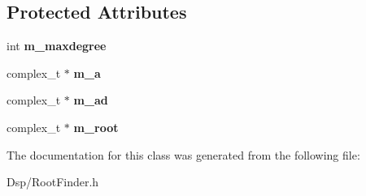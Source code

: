 \subsection*{Protected Attributes}
\begin{DoxyCompactItemize}
\item 
\hypertarget{classDsp_1_1RootFinderBase_a9fcde7ebb2e7bf68fb073331eda78945}{int {\bfseries m\-\_\-maxdegree}}\label{classDsp_1_1RootFinderBase_a9fcde7ebb2e7bf68fb073331eda78945}

\item 
\hypertarget{classDsp_1_1RootFinderBase_a7940648035e2d1f9e8eeef9e85ee4310}{complex\-\_\-t $\ast$ {\bfseries m\-\_\-a}}\label{classDsp_1_1RootFinderBase_a7940648035e2d1f9e8eeef9e85ee4310}

\item 
\hypertarget{classDsp_1_1RootFinderBase_a06263e01935c36f5d6b7450192a6b06e}{complex\-\_\-t $\ast$ {\bfseries m\-\_\-ad}}\label{classDsp_1_1RootFinderBase_a06263e01935c36f5d6b7450192a6b06e}

\item 
\hypertarget{classDsp_1_1RootFinderBase_a0554f25c37e2ed8d8b7eede6461ac0b9}{complex\-\_\-t $\ast$ {\bfseries m\-\_\-root}}\label{classDsp_1_1RootFinderBase_a0554f25c37e2ed8d8b7eede6461ac0b9}

\end{DoxyCompactItemize}


The documentation for this class was generated from the following file\-:\begin{DoxyCompactItemize}
\item 
Dsp/Root\-Finder.\-h\end{DoxyCompactItemize}
